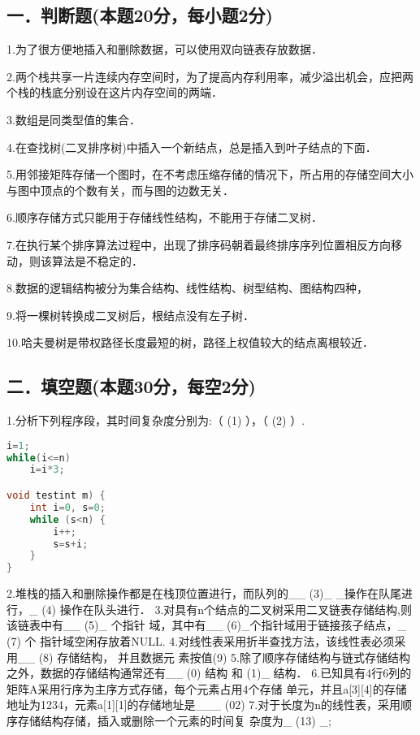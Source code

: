 
\subsection{一．判断题(本题20分，每小题2分)}
1.为了很方便地插入和删除数据，可以使用双向链表存放数据．

2.两个栈共享一片连续内存空间时，为了提高内存利用率，减少溢出机会，应把两个栈的栈底分别设在这片内存空间的两端．

3.数组是同类型值的集合．

4.在查找树(二叉排序树)中插入一个新结点，总是插入到叶子结点的下面．

5.用邻接矩阵存储一个图时，在不考虑压缩存储的情况下，所占用的存储空间大小与图中顶点的个数有关，而与图的边数无关．

6.顺序存储方式只能用于存储线性结构，不能用于存储二叉树．

7.在执行某个排序算法过程中，出现了排序码朝着最终排序序列位置相反方向移动，则该算法是不稳定的．

8.数据的逻辑结构被分为集合结构、线性结构、树型结构、图结构四种，

9.将一棵树转换成二叉树后，根结点没有左子树．

10.哈夫曼树是带权路径长度最短的树，路径上权值较大的结点离根较近．


\subsection{二．填空题(本题30分，每空2分)}
1.分析下列程序段，其时间复杂度分别为:（ (1) ），（ (2) ）.
\begin{lstlisting}[language=cpp]
i=1;
while(i<=n)
    i=i*3;

void testint m) {
    int i=0, s=0;
    while (s<n) {
        i++;
        s=s+i;
    }
}
\end{lstlisting}
2.堆栈的插入和删除操作都是在栈顶位置进行，而队列的__ (3)_ _操作在队尾进
行，_ (4) 操作在队头进行．
3.对具有n个结点的二叉树采用二叉链表存储结构,则该链表中有__ (5)_ 个指针
域，其中有__ (6)_个指针域用于链接孩子结点，_ (7) 个 指针域空闲存放着NULL.
4.对线性表采用折半查找方法，该线性表必须采用__ (8) 存储结构， 并且数据元
素按值(9)
5.除了顺序存储结构与链式存储结构之外，数据的存储结构通常还有__ (0) 结构
和
(1)_ 结构．
6.已知具有4行6列的矩阵A采用行序为主序方式存储，每个元素占用4个存储
单元，并且a[3][4]的存储地址为1234，元素a[1][1]的存储地址是___ (02)
7.对于长度为n的线性表，采用顺序存储结构存储，插入或删除一个元素的时间复
杂度为_ (13) _;

